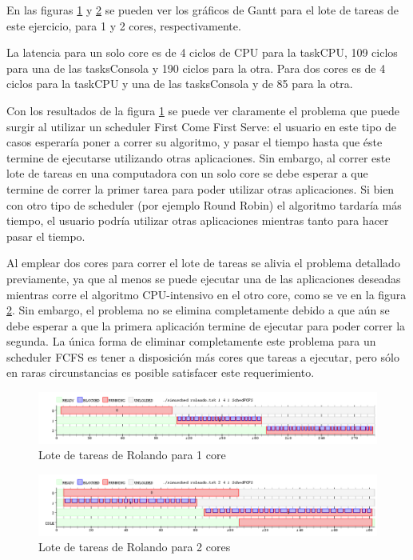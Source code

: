 
\par En las figuras \ref{fig:ej2-1core} y \ref{fig:ej2-2core} se pueden ver los gr\'aficos de Gantt para el lote de tareas de este ejercicio, para 1 y 2 cores, respectivamente.
\par La latencia para un solo core es de 4 ciclos de CPU para la taskCPU, 109 ciclos para una de las tasksConsola y 190 ciclos para la otra.
Para dos cores es de 4 ciclos para la taskCPU y una de las tasksConsola y de 85 para la otra.
\par Con los resultados de la figura \ref{fig:ej2-1core} se puede ver claramente el problema que puede surgir al utilizar un scheduler First Come First Serve: el usuario en este tipo de casos esperar\'ia poner a correr su algoritmo, y pasar el tiempo hasta que \'este termine de ejecutarse utilizando otras aplicaciones. 
Sin embargo, al correr este lote de tareas en una computadora con un solo core se debe esperar a que termine de correr la primer tarea para poder utilizar otras aplicaciones. 
Si bien con otro tipo de scheduler (por ejemplo Round Robin) el algoritmo tardar\'ia m\'as tiempo, el usuario podr\'ia utilizar otras aplicaciones mientras tanto para hacer pasar el tiempo.
\par Al emplear dos cores para correr el lote de tareas se alivia el problema detallado previamente, ya que al menos se puede ejecutar una de las aplicaciones deseadas mientras corre el algoritmo CPU-intensivo en el otro core, como se ve en la figura \ref{fig:ej2-2core}.
Sin embargo, el problema no se elimina completamente debido a que a\'un se debe esperar a que la primera aplicaci\'on termine de ejecutar para poder correr la segunda.
La \'unica forma de eliminar completamente este problema para un scheduler FCFS es tener a disposici\'on m\'as cores que tareas a ejecutar, pero s\'olo en raras circunstancias es posible satisfacer este requerimiento.
\begin{figure}[H]
\caption{Lote de tareas de Rolando para 1 core}
\label{fig:ej2-1core}
\includegraphics[width=1\textwidth]{imgs/ej2-1core}
\end{figure}
\begin{figure}[H]
\caption{Lote de tareas de Rolando para 2 cores}
\label{fig:ej2-2core}
\includegraphics[width=1\textwidth]{imgs/ej2-2core}
\end{figure}


